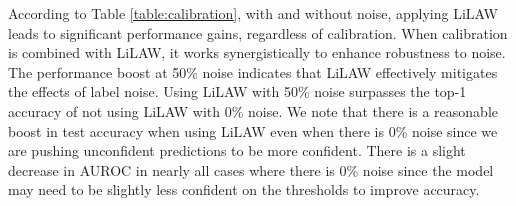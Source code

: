 \documentclass{article}
\theoremstyle{plain}
\theoremstyle{definition}
\theoremstyle{remark}
\begin{document}
\begin{table}[h!]  \caption{Results with and without calibration with different levels of symmetric noise on CIFAR-100-M.\label{table:calibration}} \end{table}
\vspace{-0.5em}
According to Table \ref{table:calibration}, with and without noise, applying LiLAW leads to significant performance gains, regardless of calibration. When calibration is combined with LiLAW, it works synergistically to enhance robustness to noise. The performance boost at 50\% noise indicates that LiLAW effectively mitigates the effects of label noise. Using LiLAW with 50\% noise surpasses the top-1 accuracy of not using LiLAW with 0\% noise. We note that there is a reasonable boost in test accuracy when using LiLAW even when there is 0\% noise since we are pushing unconfident predictions to be more confident. There is a slight decrease in AUROC in nearly all cases where there is 0\% noise since the model may need to be slightly less confident on the thresholds to improve accuracy.
\end{document}
